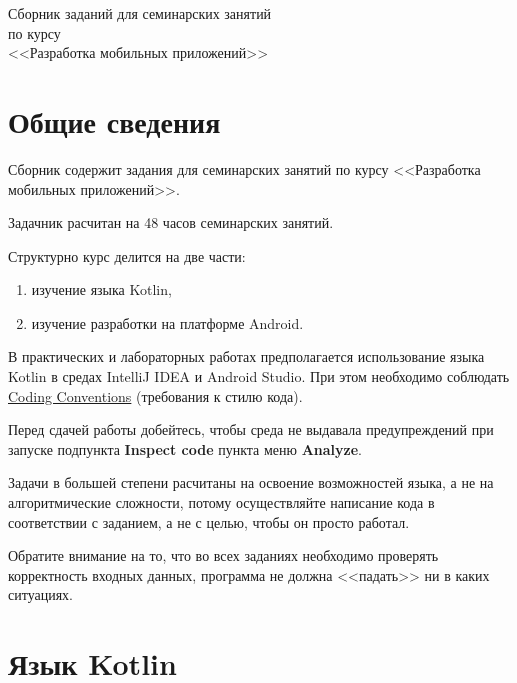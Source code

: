 \documentclass{article}
\begin{document}
{
	\thispagestyle{empty}
	\vspace*{\fill}
	\centering 

	\Large Сборник заданий для семинарских занятий \\
	по курсу \\
	<<Разработка мобильных приложений>>\\
	\large
	\vspace{40pt}
	\vspace*{\fill}
	\newpage
}

\tableofcontents
\newpage
\section{Общие сведения}

Сборник содержит задания для семинарских занятий по курсу <<Разработка мобильных приложений>>. 

Задачник расчитан на 48 часов семинарских занятий.

Структурно курс делится на две части:

\begin{enumerate}
	\item изучение языка Kotlin,\\
	\item изучение разработки на платформе Android.
\end{enumerate}

В практических и лабораторных работах предполагается использование языка Kotlin в средах
IntelliJ IDEA и Android Studio. При этом необходимо соблюдать 
\href{https://kotlinlang.org/docs/reference/coding-conventions.html}{Coding Conventions} (требования к стилю кода). 

Перед сдачей работы добейтесь, чтобы среда не выдавала предупреждений 
при запуске подпункта \textbf{Inspect code} пункта меню \textbf{Analyze}.

Задачи в большей степени расчитаны на освоение возможностей языка, а не
на алгоритмические сложности, потому
осуществляйте написание кода в соответствии с заданием, а не с целью, чтобы 
он просто работал.

Обратите внимание на то, что во всех заданиях необходимо проверять корректность входных данных, программа не должна <<падать>>
ни в каких ситуациях.

\section{Язык Kotlin}
\end{document}
